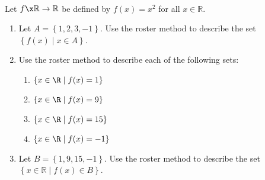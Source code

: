 \begin{previewactivity} \label{PA:functionsandsets2} \hfill \\
Let $f\x  \mathbb{R} \to \mathbb{R}$ be defined by $f ( x ) = x^2$ for all 
$x \in \mathbb{R}$.

\begin{enumerate}

\item Let $A = \left\{ 1, 2, 3, -1 \right\}$.  Use the roster method to describe the set 
$\left\{ f ( x ) \mid x \in A \right\}$.

\item Use the roster method to describe each of the following sets:
\begin{multicols}{2}
\begin{enumerate}
\item $\left\{ x \in \R \mid f( x ) = 1 \right\}$
\item $\left\{ x \in \R \mid f( x ) = 9 \right\}$
\item $\left\{ x \in \R \mid f( x ) = 15 \right\}$
\item $\left\{ x \in \R \mid f( x ) = -1 \right\}$
\end{enumerate}
\end{multicols}
%

\item Let $B = \left\{ 1, 9, 15, -1 \right\}$.  Use the roster method to describe the set \linebreak
$\left\{ x \in \mathbb{R} \mid f ( x ) \in B \right\}$.
\end{enumerate}
\end{previewactivity}
\hbreak

